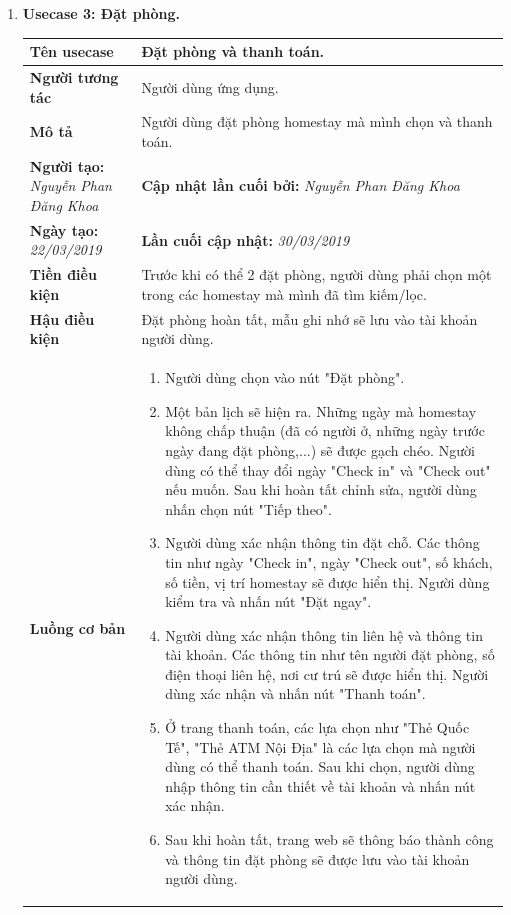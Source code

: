 \begin{enumerate}[label=\textbf{(\alph*)}]
	\item \textbf{Usecase 3: Đặt phòng.}
	\begin{center}
		\begin{longtable}{ | l |p{10cm}|}
			\hline
			\textbf{Tên usecase} & Đặt phòng và thanh toán. \\ \hline
			\textbf{Người tương tác} & Người dùng ứng dụng. \\ \hline   
			\textbf{Mô tả} &  Người dùng đặt phòng homestay mà mình chọn và thanh toán.\\ \hline  
			\textbf{Người tạo:} \textit{Nguyễn Phan Đăng Khoa} & \textbf{Cập nhật lần cuối bởi:} \textit{Nguyễn Phan Đăng Khoa} \\ \hline
			\textbf{Ngày tạo:} \textit{22/03/2019} & \textbf{Lần cuối cập nhật:} \textit{30/03/2019} \\ \hline
			\textbf{Tiền điều kiện} &  Trước khi có thể 2 đặt phòng, người dùng phải chọn một trong các homestay mà mình đã tìm kiếm/lọc. \\ \hline 
			\textbf{Hậu điều kiện} &  Đặt phòng hoàn tất, mẫu ghi nhớ sẽ lưu vào tài khoản người dùng. \\ \hline 
			\textbf{Luồng cơ bản} & 
			\begin{enumerate}
				\item  Người dùng chọn vào nút "Đặt phòng".
				\item Một bản lịch sẽ hiện ra. Những ngày mà homestay không chấp thuận (đã có người ở, những ngày trước ngày đang đặt phòng,...) sẽ được gạch chéo. Người dùng có thể thay đổi ngày "Check in" và "Check out" nếu muốn. Sau khi hoàn tất chỉnh sửa, người dùng nhấn chọn nút "Tiếp theo".
				\item Người dùng xác nhận thông tin đặt chỗ. Các thông tin như ngày "Check in", ngày "Check out", số khách, số tiền, vị trí homestay sẽ được hiển thị. Người dùng kiểm tra và nhấn nút "Đặt ngay".
				\item Người dùng xác nhận thông tin liên hệ và thông tin tài khoản. Các thông tin như tên người đặt phòng, số điện thoại liên hệ, nơi cư trú sẽ được hiển thị. Người dùng xác  nhận và nhấn nút "Thanh toán".
				\item  Ở trang thanh toán, các lựa chọn như "Thẻ Quốc Tế", "Thẻ ATM Nội Địa" là các lựa chọn mà người dùng có thể thanh toán. Sau khi chọn, người dùng nhập thông tin cần thiết về tài khoản và nhấn nút xác nhận.
				\item Sau khi hoàn tất, trang web sẽ thông báo thành công và thông tin đặt phòng sẽ được lưu vào tài khoản người dùng.

\end{enumerate}
\end{longtable}
\end{center}
\end{enumerate}

